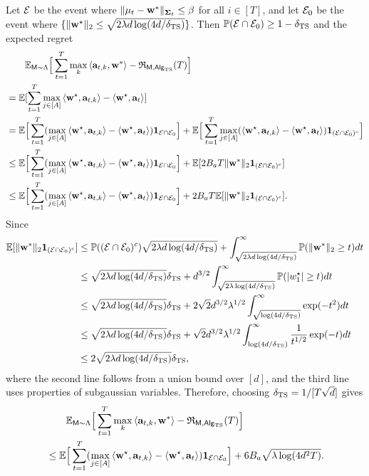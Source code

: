 Let ${\mathcal E}$ be the event where $\|{{\mathbf\mu}}_t-{\mathbf w}^*\|_{{{\mathbf\Sigma}}_t}\leq\beta$ for all $i\in[T]$, and let ${\mathcal E}_0$ be the event where $\{\|{\mathbf w}^\star\|_2\leq\sqrt{2\lambda d\log(4d/{\delta_{{\mathrm{TS}}}})}\}$. Then $\mathbb{P}({\mathcal E}\cap{\mathcal E}_0)\geq 1-{\delta_{{\mathrm{TS}}}}$ and the expected regret
\begin{align*}
&\qquad\mathbb{E}_{{\mathsf{M}}\sim{\Lambda}}\Big[\sum_{t=1}^{T}\max_{k}\left\langle{\mathbf a}_{t,k},{\mathbf w}^*\right\rangle-{\mathfrak{R}}_{{\mathsf{M}},{\mathsf{Alg}}_{\mathrm{TS}}}({T})\Big]\\
&=\mathbb{E}[\sum_{t=1}^T \max_{j\in[A]}\left\langle{\mathbf w}^\star,{\mathbf a}_{t,k}\right\rangle-\left\langle{\mathbf w}^\star,{\mathbf a}_{t}\right\rangle]\\
  &=
  \mathbb{E}\Big[\sum_{t=1}^T (\max_{j\in[A]}\left\langle{\mathbf w}^\star,{\mathbf a}_{t,k}\right\rangle-\left\langle{\mathbf w}^\star,{\mathbf a}_{t}\right\rangle) {\mathbf 1}_{{\mathcal E}\cap{\mathcal E}_0}\Big]
  +
   \mathbb{E}\Big[\sum_{t=1}^T \max_{j\in[A]}(\left\langle{\mathbf w}^\star,{\mathbf a}_{t,k}\right\rangle-\left\langle{\mathbf w}^\star,{\mathbf a}_{t}\right\rangle){\mathbf 1}_{({\mathcal E}\cap{\mathcal E}_0)^c}\Big]\\
   &\leq 
   \mathbb{E}\Big[\sum_{t=1}^T (\max_{j\in[A]}\left\langle{\mathbf w}^\star,{\mathbf a}_{t,k}\right\rangle-\left\langle{\mathbf w}^\star,{\mathbf a}_{t}\right\rangle) {\mathbf 1}_{{\mathcal E}\cap{\mathcal E}_0}\Big]
+
\mathbb{E}[2B_aT\|{\mathbf w}^*\|_2{\mathbf 1}_{({\mathcal E}\cap{\mathcal E}_0)^c}]
  \\
  &\leq 
  \mathbb{E}\Big[\sum_{t=1}^T (\max_{j\in[A]}\left\langle{\mathbf w}^\star,{\mathbf a}_{t,k}\right\rangle-\left\langle{\mathbf w}^\star,{\mathbf a}_{t}\right\rangle) {\mathbf 1}_{{\mathcal E}\cap{\mathcal E}_0}\Big]+2B_aT\mathbb{E}[\|{\mathbf w}^*\|_2{\mathbf 1}_{({\mathcal E}\cap{\mathcal E}_0)^c}].
\end{align*}
Since 
\begin{align*}
 \mathbb{E}[\|{\mathbf w}^*\|_2{\mathbf 1}_{({\mathcal E}\cap{\mathcal E}_0)^c}]
    &\leq
\mathbb{P}({({\mathcal E}\cap{\mathcal E}_0)^c})\sqrt{2\lambda d\log(4d/{\delta_{{\mathrm{TS}}}})}
+
\int^\infty_{\sqrt{2\lambda d\log(4d/{\delta_{{\mathrm{TS}}}})}}\mathbb{P}(\|{\mathbf w}^*\|_2\geq t)dt\\
&\leq
\sqrt{2\lambda d\log(4d/{\delta_{{\mathrm{TS}}}})}{\delta_{{\mathrm{TS}}}}+d^{3/2}\int^\infty_{\sqrt{2\lambda \log(4d/{\delta_{{\mathrm{TS}}}})}}\mathbb{P}(|w_1^\star|\geq t)dt
\\
&\leq
\sqrt{2\lambda d\log(4d/{\delta_{{\mathrm{TS}}}})}{\delta_{{\mathrm{TS}}}}+2\sqrt{2}d^{3/2}\lambda^{1/2}\int^\infty_{\sqrt{ \log(4d/{\delta_{{\mathrm{TS}}}})}}\exp(-{t^2})dt\\
&\leq
\sqrt{2\lambda d\log(4d/{\delta_{{\mathrm{TS}}}})}{\delta_{{\mathrm{TS}}}}+\sqrt{2}d^{3/2}\lambda^{1/2}\int^\infty_{{ \log(4d/{\delta_{{\mathrm{TS}}}})}}\frac{1}{t^{1/2}}\exp(-{t})dt\\
&\leq 
2\sqrt{2\lambda d\log(4d/{\delta_{{\mathrm{TS}}}})}{\delta_{{\mathrm{TS}}}},
\end{align*}
where the second line follows from a union bound over $[d]$, and the third line uses properties of subgaussian variables. Therefore, choosing ${\delta_{{\mathrm{TS}}}}=1/[T\sqrt{ d}]$  gives 
\begin{align}
&\qquad\mathbb{E}_{{\mathsf{M}}\sim{\Lambda}}\Big[\sum_{t=1}^{T}\max_{k}\left\langle{\mathbf a}_{t,k},{\mathbf w}^*\right\rangle-{\mathfrak{R}}_{{\mathsf{M}},{\mathsf{Alg}}_{\mathrm{TS}}}({T})\Big]\notag\\
    &\leq
     \mathbb{E}\Big[\sum_{t=1}^T (\max_{j\in[A]}\left\langle{\mathbf w}^\star,{\mathbf a}_{t,k}\right\rangle-\left\langle{\mathbf w}^\star,{\mathbf a}_{t}\right\rangle) {\mathbf 1}_{{\mathcal E}\cap{\mathcal E}_0}\Big]+6B_a\sqrt{\lambda\log(4d^2T)}.\label{eq:ts_linear_regret_decomp}
\end{align}
